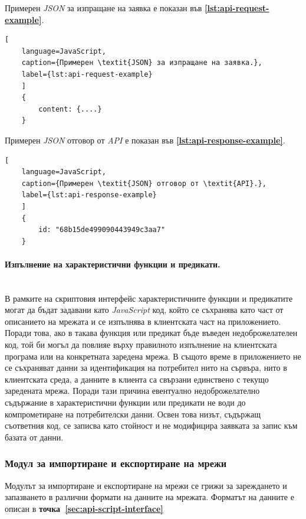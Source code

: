 Примерен \textit{JSON} за изпращане на заявка е показан във \textbf{\autoref{lst:api-request-example}}.
\begin{lstlisting}[
	language=JavaScript,
	caption={Примерен \textit{JSON} за изпращане на заявка.},
	label={lst:api-request-example}
	]
	{
		content: {....}
	}
\end{lstlisting}

Примерен \textit{JSON} отговор от \textit{API} е показан във \textbf{\autoref{lst:api-response-example}}.
\begin{lstlisting}[
	language=JavaScript,
	caption={Примерен \textit{JSON} отговор от \textit{API}.},
	label={lst:api-response-example}
	]
	{
		id: "68b15de499090443949c3aa7"
	}
\end{lstlisting}

\paragraph{Изпълнение на характеристични функции и предикати.}
\mbox{}\\
В рамките на скриптовия интерфейс характеристичните функции и предикатите могат да бъдат задавани като \textit{JavaScript} код, който се съхранява като част от описанието на мрежата и се изпълнява в клиентската част на приложението. Поради това, ако в такава функция или предикат бъде въведен недоброжелателен код, той би могъл да повлияе върху правилното изпълнение на клиентската програма или на конкретната заредена мрежа. В същото време в приложението не се съхраняват данни за идентификация на потребител нито на сървъра, нито в клиентската среда, а данните в клиента са свързани единствено с текущо заредената мрежа. Поради тази причина евентуално недоброжелателно съдържание в характеристични функции или предикати не води до компрометиране на потребителски данни. Освен това низът, съдържащ съответния код, се записва като стойност и не модифицира заявката за запис към базата от данни.

\vspace{0.2cm}

\subsubsection{Модул за импортиране и експортиране на мрежи}

\hspace*{2.5em}Модулът за импортиране и експортиране на мрежи се грижи за зареждането и запазването в различни формати на данните на мрежата. Форматът на данните е описан в \textbf{точка~\ref{sec:api-script-interface}} 

